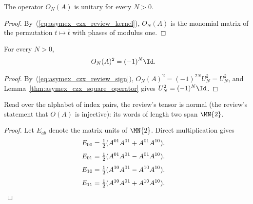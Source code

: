 \begin{lemma}
    \label{thm:asymex_czx_review_unitarity}
    \leanok
    The operator $O_N(A)$ is unitary for every $N>0$.
\end{lemma}

\begin{proof}
    \leanok
    By~(\ref{eq:asymex_czx_review_kernel}), $O_N(A)$ is the monomial matrix
    of the permutation $t\mapsto\bar t$ with phases of modulus one.
\end{proof}

\begin{lemma}
    \label{thm:asymex_czx_review_square}
    \leanok
    For every $N>0$,
    \begin{align}
        O_N(A)^2 & =(-1)^N\Id.
        \notag
    \end{align}
\end{lemma}

\begin{proof}
    \leanok
    By~(\ref{eq:asymex_czx_review_sign}),
    $O_N(A)^2=(-1)^{2N}U_N^2=U_N^2$, and
    Lemma~\ref{thm:asymex_czx_square_operator} gives $U_N^2=(-1)^N\Id$.
\end{proof}

\begin{lemma}
    \label{thm:asymex_czx_review_normal}
    \leanok
    Read over the alphabet of index pairs, the review's tensor is normal
    (the review's statement that $O(A)$ is injective): its words of
    length two span $\MN{2}$.
\end{lemma}

\begin{proof}
    \leanok
    Let $E_{ab}$ denote the matrix units of $\MN{2}$. Direct multiplication
    gives
    \begin{align}
        E_{00} & =\tfrac12(A^{01}A^{01}+A^{01}A^{10}).
        \notag
    \end{align}
    \begin{align}
        E_{01} & =\tfrac12(A^{01}A^{01}-A^{01}A^{10}).
        \notag
    \end{align}
    \begin{align}
        E_{10} & =\tfrac12(A^{10}A^{01}-A^{10}A^{10}).
        \notag
    \end{align}
    \begin{align}
        E_{11} & =\tfrac12(A^{10}A^{01}+A^{10}A^{10}).
        \notag
    \end{align}
\end{proof}

